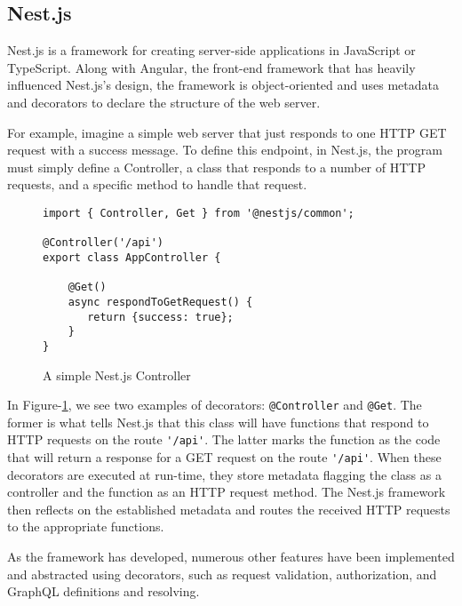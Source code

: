 \subsection{Nest.js} \label{sec:nest-js}
Nest.js is a framework for creating server-side applications in JavaScript or TypeScript.  Along with Angular, the front-end framework that has heavily influenced Nest.js's design, the framework is object-oriented and uses metadata and decorators to declare the structure of the web server.

For example, imagine a simple web server that just responds to one HTTP GET request with a success message.  To define this endpoint, in Nest.js, the program must simply define a Controller, a class that responds to a number of HTTP requests, and a specific method to handle that request.

\begin{figure}
    \begin{verbatim}
import { Controller, Get } from '@nestjs/common';

@Controller('/api')
export class AppController {

    @Get()
    async respondToGetRequest() {
       return {success: true};
    }
}
    \end{verbatim}
    \caption{A simple Nest.js Controller}
    \label{fig:nest-controller}
\end{figure}

In Figure-\ref{fig:nest-controller}, we see two examples of decorators: \Verb!@Controller! and \Verb!@Get!.  The former is what tells Nest.js that this class will have functions that respond to HTTP requests on the route \Verb!'/api'!.  The latter marks the function as the code that will return a response for a GET request on the route \Verb!'/api'!.  When these decorators are executed at run-time, they store metadata flagging the class as a controller and the function as an HTTP request method.  The Nest.js framework then reflects on the established metadata and routes the received HTTP requests to the appropriate functions.

As the framework has developed, numerous other features have been implemented and abstracted using decorators, such as request validation, authorization, and GraphQL definitions and resolving.